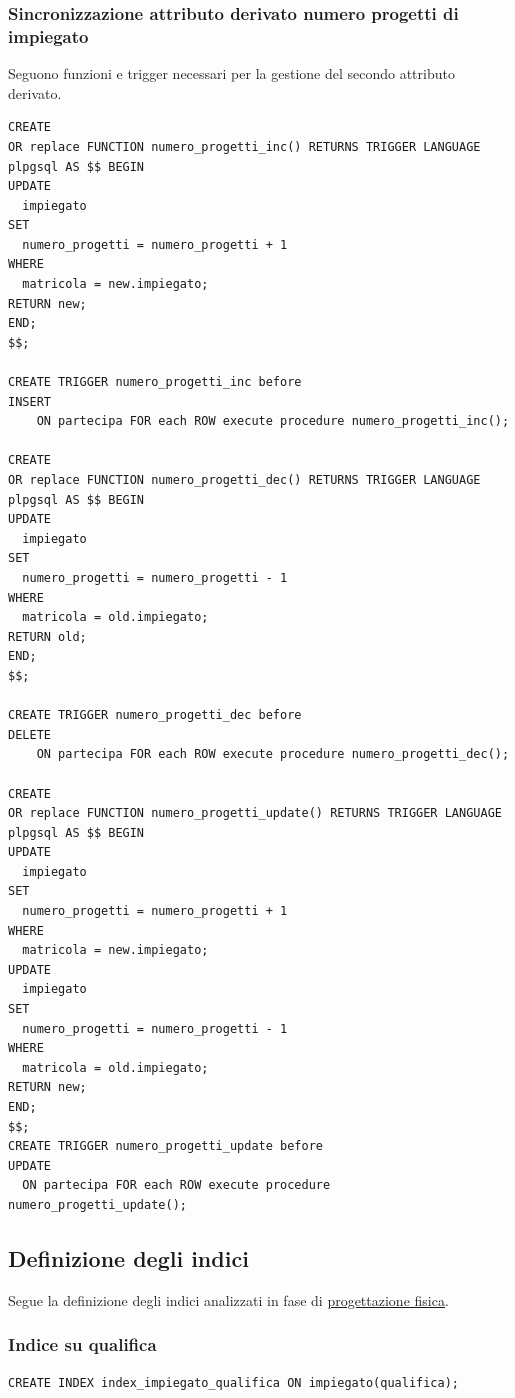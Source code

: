 \documentclass{article}
\begin{document}
\newpage

\subsubsection{Sincronizzazione attributo derivato numero progetti di impiegato}
Seguono funzioni e trigger necessari per la gestione del secondo attributo derivato.
\begin{verbatim}
CREATE 
OR replace FUNCTION numero_progetti_inc() RETURNS TRIGGER LANGUAGE plpgsql AS $$ BEGIN 
UPDATE 
  impiegato 
SET 
  numero_progetti = numero_progetti + 1 
WHERE 
  matricola = new.impiegato;
RETURN new;
END;
$$;

CREATE TRIGGER numero_progetti_inc before 
INSERT 
    ON partecipa FOR each ROW execute procedure numero_progetti_inc();

CREATE 
OR replace FUNCTION numero_progetti_dec() RETURNS TRIGGER LANGUAGE plpgsql AS $$ BEGIN 
UPDATE 
  impiegato 
SET 
  numero_progetti = numero_progetti - 1 
WHERE 
  matricola = old.impiegato;
RETURN old;
END;
$$;

CREATE TRIGGER numero_progetti_dec before 
DELETE 
    ON partecipa FOR each ROW execute procedure numero_progetti_dec();

CREATE 
OR replace FUNCTION numero_progetti_update() RETURNS TRIGGER LANGUAGE plpgsql AS $$ BEGIN 
UPDATE 
  impiegato 
SET 
  numero_progetti = numero_progetti + 1 
WHERE 
  matricola = new.impiegato;
UPDATE 
  impiegato 
SET 
  numero_progetti = numero_progetti - 1 
WHERE 
  matricola = old.impiegato;
RETURN new;
END;
$$;
CREATE TRIGGER numero_progetti_update before 
UPDATE 
  ON partecipa FOR each ROW execute procedure numero_progetti_update();
\end{verbatim}

\newpage

\subsection{Definizione degli indici}
Segue la definizione degli indici analizzati in fase di \hyperlink{page.17}{progettazione fisica}.

\subsubsection{Indice su qualifica}
\begin{verbatim}
CREATE INDEX index_impiegato_qualifica ON impiegato(qualifica);

\end{verbatim}
\end{document}
